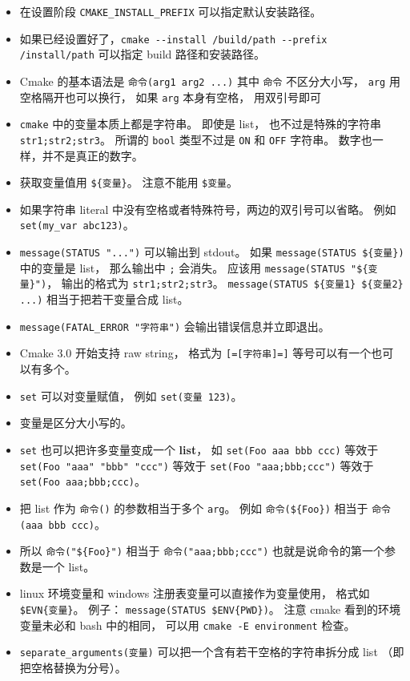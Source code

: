 \begin{itemize}
\item 在设置阶段 \verb`CMAKE_INSTALL_PREFIX` 可以指定默认安装路径。
\item 如果已经设置好了，\verb`cmake --install /build/path --prefix /install/path` 可以指定 build 路径和安装路径。
\item Cmake 的基本语法是 \verb`命令(arg1 arg2 ...)` 其中 \verb`命令` 不区分大小写， \verb`arg` 用空格隔开也可以换行， 如果 \verb`arg` 本身有空格， 用双引号即可
\item \verb`cmake` 中的变量本质上都是字符串。 即使是 list， 也不过是特殊的字符串 \verb`str1;str2;str3`。 所谓的 \verb`bool` 类型不过是 \verb`ON` 和 \verb`OFF` 字符串。 数字也一样，并不是真正的数字。
\item 获取变量值用 \verb`${变量}`。 注意不能用 \verb`$变量`。
\item 如果字符串 literal 中没有空格或者特殊符号，两边的双引号可以省略。 例如 \verb`set(my_var abc123)`。
\item \verb`message(STATUS "...")` 可以输出到 stdout。 如果 \verb`message(STATUS ${变量})` 中的变量是 list， 那么输出中 \verb`;` 会消失。 应该用 \verb`message(STATUS "${变量}")`， 输出的格式为 \verb`str1;str2;str3`。 \verb`message(STATUS ${变量1} ${变量2} ...)` 相当于把若干变量合成 list。
\item \verb`message(FATAL_ERROR "字符串")` 会输出错误信息并立即退出。
\item Cmake 3.0 开始支持 raw string， 格式为 \verb`[=[字符串]=]` 等号可以有一个也可以有多个。
\item \verb`set` 可以对变量赋值， 例如 \verb`set(变量 123)`。
\item 变量是区分大小写的。
\item \verb`set` 也可以把许多变量变成一个 \textbf{list}， 如 \verb`set(Foo aaa bbb ccc)` 等效于 \verb`set(Foo "aaa" "bbb" "ccc")` 等效于 \verb`set(Foo "aaa;bbb;ccc")` 等效于 \verb`set(Foo aaa;bbb;ccc)`。
\item 把 list 作为 \verb`命令()` 的参数相当于多个 \verb`arg`。 例如 \verb`命令(${Foo})` 相当于 \verb`命令(aaa bbb ccc)`。
\item 所以 \verb`命令("${Foo}")` 相当于 \verb`命令("aaa;bbb;ccc")` 也就是说命令的第一个参数是一个 list。
\item linux 环境变量和 windows 注册表变量可以直接作为变量使用， 格式如 \verb`$EVN{变量}`。 例子： \verb`message(STATUS $ENV{PWD})`。 注意 cmake 看到的环境变量未必和 bash 中的相同， 可以用 \verb`cmake -E environment` 检查。
\item \verb`separate_arguments(变量)` 可以把一个含有若干空格的字符串拆分成 list （即把空格替换为分号）。
\end{itemize}

